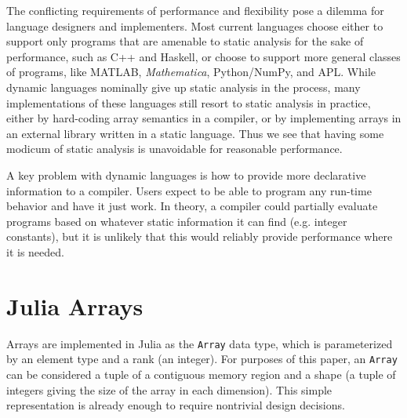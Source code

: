 \documentclass[preprint]{sigplanconf}
\newcommand{\MATLAB}{\textsc{MATLAB}}
\newcommand{\Mathematica}{\textit{Mathematica}}
\newcommand{\code}[1]{\texttt{#1}}
\begin{document}

The conflicting requirements of performance and flexibility pose a dilemma for
language designers and implementers. Most current languages choose either to
support only programs that are amenable to static analysis for the sake of
performance, such as C++ and Haskell, or choose to support more general
classes of programs, like \MATLAB, \Mathematica, Python/NumPy, and APL. While
dynamic languages nominally give up static analysis in the process, many
implementations of these languages still resort to static analysis in
practice, either by hard-coding array semantics in a compiler, or by
implementing arrays in an external library written in a static language. Thus
we see that having some modicum of static analysis is unavoidable for
reasonable performance.

A key problem with dynamic languages is how to provide more declarative
information to a compiler. Users expect to be able to program any
run-time behavior and have it just work. In theory, a compiler could
partially evaluate programs based on whatever static information it can
find (e.g. integer constants), but it is unlikely that this would reliably
provide performance where it is needed.


\section{Julia Arrays}

Arrays are implemented in Julia\cite{Bezanson:2012jf} as the \code{Array}
data type, which is parameterized by an element type and a rank (an integer).
For purposes of this paper, an \code{Array} can be considered a tuple of
a contiguous memory region and a shape (a tuple of integers giving the size
of the array in each dimension). This simple representation is already
enough to require nontrivial design decisions.

\end{document}
